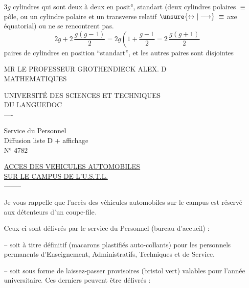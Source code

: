 
$3g$ cylindres qui sont deux à deux en posit°, standart (deux cylindres polaires $\equiv$ pôle, ou un cylindre polaire et un transverse relatif $\unsure{\leftrightarrow|\longrightarrow}\ \equiv$ axe équatorial) ou ne se rencontrent pas.
\[
2g+2\,\frac{g(g-1)}2=2g\left(1+\frac{g-1}2\right. =2\,\frac{g(g+1)}2
\]
paires de cylindres en position ``standart'', et les autres paires sont disjointes

MR LE PROFESSEUR GROTHENDIECK ALEX. D\\
MATHEMATIQUES



UNIVERSITÉ DES SCIENCES ET TECHNIQUES\\
DU LANGUEDOC\\
----

Service du Personnel\\
Diffusion liste D + affichage\\
N° 4782

\uline{ACCES DES VEHICULES AUTOMOBILES}\\
\uline{SUR LE CAMPUS DE L'U.S.T.L.}\\
--------

Je vous rappelle que l'accès des véhicules automobiles sur le campus est réservé aux détenteurs d'un coupe-file.

Ceux-ci sont délivrés par le service du Personnel (bureau d'accueil) :

-- soit à titre définitif (macarons plastifiés auto-collants) pour les personnels permanents d'Enseignement, Administratifs, Techniques et de Service.

-- soit sous forme de laissez-passer provisoires (bristol vert) valables pour l'année universitaire. Ces derniers peuvent être délivrés :

